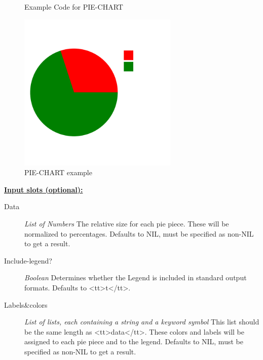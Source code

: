 \documentclass [11pt]{book}
\begin{document}
\begin{itemize}
\begin{figure}
\caption{Example Code for PIE-CHART}

\label{fig:example-code-PIE-CHART}

\end{figure}

\begin{figure}
\begin{center}
\includegraphics[width=3in,height=3in]{../images/example-PIE-CHART.pdf}
\end{center}

\caption{PIE-CHART example}

\label{fig:PIE-CHART}

\end{figure}





\textbf{
\underline{Input slots (optional):}}

\begin{description}

\item [Data]
\emph{List of Numbers} The relative size for each pie piece. These will be normalized to percentages.
Defaults to NIL, must be specified as non-NIL to get a result.


\item [Include-legend?]
\emph{Boolean} Determines whether the Legend is included in standard output formats. Defaults to <tt>t</tt>.


\item [Labels&colors]
\emph{List of lists, each containing a string and a keyword symbol} This list should be the same
length as <tt>data</tt>. These colors and labels will be assigned to each pie piece and to the legend.
Defaults to NIL, must be specified as non-NIL to get a result.



\end{description}
\end{itemize}
\end{document}
